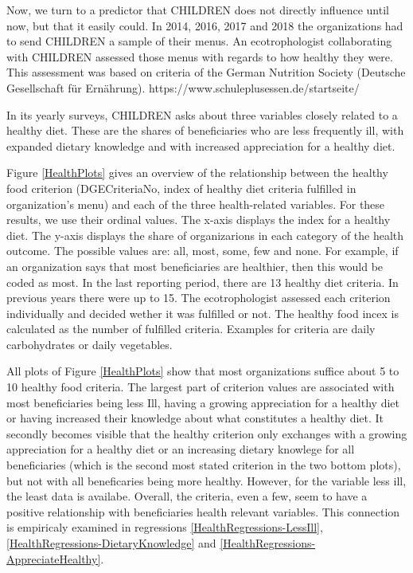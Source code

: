 \documentclass[12pt, a4paper, titlepage]{article}\usepackage[]{graphicx}\usepackage[]{color}
\begin{document}
Now, we turn to a predictor that CHILDREN does not directly influence until now, but that it easily could. In 2014, 2016, 2017 and 2018 the organizations had to send CHILDREN a sample of their menus. An ecotrophologist collaborating with CHILDREN assessed those menus with regards to how healthy they were. This assessment was based on criteria of the German Nutrition Society (Deutsche Gesellschaft für Ernährung). https://www.schuleplusessen.de/startseite/

In its yearly surveys, CHILDREN asks about three variables closely related to a healthy diet. These are the shares of beneficiaries who are less frequently ill, with expanded dietary knowledge and with increased appreciation for a healthy diet. 

Figure \ref{HealthPlots} gives an overview of the relationship between the healthy food criterion (DGECriteriaNo, index of healthy diet criteria fulfilled in organization's menu) and each of the three health-related variables. For these results, we use their ordinal values. The x-axis displays the index for a healthy diet. The y-axis displays the share of organizarions in each category of the health outcome. The possible values are: all, most, some, few and none. For example, if an organization says that most beneficiaries are healthier, then this would be coded as most. In the last reporting period, there are 13 healthy diet criteria. In previous years there were up to 15. The ecotrophologist assessed each criterion individually and decided wether it was fulfilled or not. The healthy food incex is calculated as the number of fulfilled criteria. Examples for criteria are daily carbohydrates or daily vegetables.  

All plots of Figure \ref{HealthPlots} show that most organizations suffice about 5 to 10 healthy food criteria. The largest part of criterion values are associated with most beneficiaries being less Ill, having a growing appreciation for a healthy diet or having increased their knowledge about what constitutes a healthy diet. It secondly becomes visible that the healthy criterion only exchanges with a growing appreciation for a healthy diet or an increasing dietary knowlege for all beneficiaries (which is the second most stated criterion in the two bottom plots), but not with all beneficaries being more healthy. However, for the variable less ill, the least data is availabe. Overall, the criteria, even a few, seem to have a positive relationship with beneficiaries health relevant variables. This connection is empiricaly examined in regressions \ref{HealthRegressions-LessIll}, \ref{HealthRegressions-DietaryKnowledge} and \ref{HealthRegressions-AppreciateHealthy}.
\end{document}

